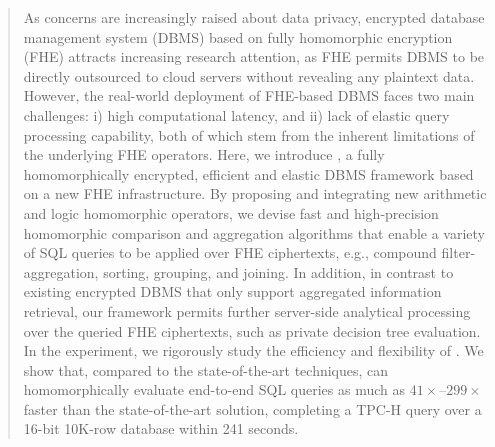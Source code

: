 \begin{abstract}
As concerns are increasingly raised about data privacy,
encrypted database management system (DBMS) based on fully homomorphic 
encryption (FHE) attracts increasing research attention, as FHE permits DBMS 
to be directly outsourced to cloud servers without revealing any plaintext data. 
However, the real-world deployment of FHE-based DBMS faces two main challenges: 
i) high computational latency, and ii) lack of elastic query processing capability, 
both of which stem from the inherent limitations of the underlying FHE operators.
Here, we introduce \NAME, a fully homomorphically encrypted, 
efficient and elastic DBMS framework based on a new FHE infrastructure.
By proposing and integrating new arithmetic and logic homomorphic operators,
we devise fast and high-precision homomorphic comparison and aggregation algorithms
that enable a variety of SQL queries to be applied over FHE ciphertexts, 
e.g., compound filter-aggregation, sorting, grouping, and
joining. In addition, in contrast to existing encrypted DBMS that only support
aggregated information retrieval, our framework permits further server-side 
analytical processing over the queried FHE ciphertexts, such as private
decision tree evaluation.
In the experiment, we rigorously study the efficiency and flexibility of 
\NAME. We show that, compared to the state-of-the-art techniques,
\NAME can homomorphically evaluate end-to-end SQL queries 
as much as $41\times$--$299\times$ faster than the state-of-the-art solution,
completing a TPC-H query over a 16-bit 10K-row database within 241 seconds.

\end{abstract}

